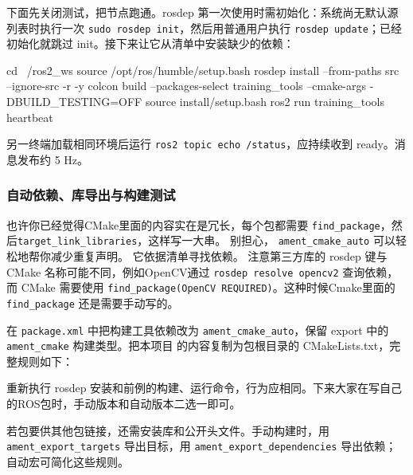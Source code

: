 \begin{example}[建立共用教学包]
下面先关闭测试，把节点跑通。rosdep 第一次使用时需初始化：系统尚无默认源列表时执行一次 \texttt{sudo rosdep init}，然后用普通用户执行 \texttt{rosdep update}；已经初始化就跳过 init。接下来让它从清单中安装缺少的依赖：
\par\medskip\noindent\begin{minipage}{\linewidth}
\begin{tbash}
cd ~/ros2_ws
source /opt/ros/humble/setup.bash
rosdep install --from-paths src --ignore-src -r -y
colcon build --packages-select training_tools --cmake-args -DBUILD_TESTING=OFF
source install/setup.bash
ros2 run training_tools heartbeat
\end{tbash}
\end{minipage}\par\smallskip
另一终端加载相同环境后运行 \texttt{ros2 topic echo /status}，应持续收到 ready。消息发布约 5 Hz。
\end{example}

\subsubsection{自动依赖、库导出与构建测试}
也许你已经觉得CMake里面的内容实在是冗长，每个包都需要 \nolinkurl{find_package}，然后\nolinkurl{target_link_libraries}，这样写一大串。
别担心， \texttt{ament\_cmake\_auto} 可以轻松地帮你减少重复声明。
它依据清单寻找依赖。
注意第三方库的 rosdep 键与 CMake 名称可能不同，例如OpenCV通过 \verb|rosdep resolve opencv2| 查询依赖，而 CMake  需要使用 \verb|find_package(OpenCV REQUIRED)|。这种时候Cmake里面的 \verb|find_package| 还是需要手动写的。

\begin{example}
在 \texttt{package.xml} 中把构建工具依赖改为 \texttt{ament\_cmake\_auto}，保留 export 中的 \texttt{ament\_cmake} 构建类型。把本项目  的内容复制为包根目录的 CMakeLists.txt，完整规则如下：
\par\medskip\noindent\begin{minipage}{\linewidth}

\end{minipage}\par\smallskip
重新执行 rosdep 安装和前例的构建、运行命令，行为应相同。下来大家在写自己的ROS包时，手动版本和自动版本二选一即可。
\end{example}

若包要供其他包链接，还需安装库和公开头文件。手动构建时，用 \nolinkurl{ament_export_targets} 导出目标，用 \nolinkurl{ament_export_dependencies} 导出依赖；自动宏可简化这些规则。

